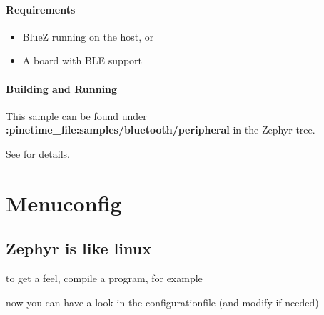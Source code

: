 \documentclass[letterpaper,10pt,english]{sphinxmanual}
\begin{document}
\subsubsection{Requirements}
\label{\detokenize{samples/bluetooth/peripheral/README:requirements}}\begin{itemize}
\item {} 
BlueZ running on the host, or

\item {} 
A board with BLE support

\end{itemize}


\subsubsection{Building and Running}
\label{\detokenize{samples/bluetooth/peripheral/README:building-and-running}}
This sample can be found under {\color{red}\bfseries{}:pinetime\_file:\textasciigrave{}samples/bluetooth/peripheral\textasciigrave{}} in the
Zephyr tree.

See {\hyperref[\detokenize{samples/bluetooth/bluetooth:bluetooth-samples}]{}} for details.


\chapter{Menuconfig}
\label{\detokenize{menuconfig:menuconfig}}\label{\detokenize{menuconfig::doc}}

\section{Zephyr is like linux}
\label{\detokenize{menuconfig:zephyr-is-like-linux}}

  to get a feel, compile a program, for example

\begin{sphinxVerbatim}[commandchars=\\\{\}]
\end{sphinxVerbatim}

now you can have a look in the configurationfile (and modify if needed)
\end{document}
